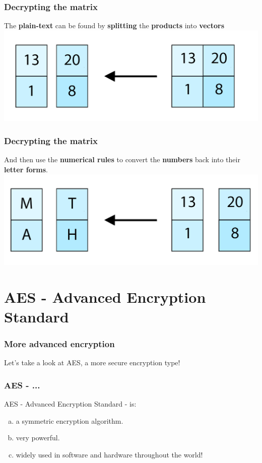 \documentclass[11pt]{beamer}
\begin{document}
\begin{frame}\frametitle{Decrypting the matrix}

The \textbf{plain-text} can be found by \textbf{splitting} the \textbf{products} into \textbf{vectors}
\center \includegraphics[scale=0.2]{linear_2.png}

\end{frame}

\begin{frame}\frametitle{Decrypting the matrix}

And then use the \textbf{numerical rules} to convert the \textbf{numbers} back into their \textbf{letter forms}.
\center \includegraphics[scale=0.2]{math_2.png}

\end{frame}

\section{AES - Advanced Encryption Standard}
\begin{frame}\frametitle{More advanced encryption}
\center Let's take a look at AES, a more secure encryption type!
\end{frame}

\begin{frame}\frametitle{AES - ...}
	AES - Advanced Encryption Standard - is: 
	\begin{enumerate}[a.]
	\item a symmetric encryption algorithm.
	\item very powerful.
	\item widely used in software and hardware throughout the world! 
	\end{enumerate}
\end{frame}
\end{document}
